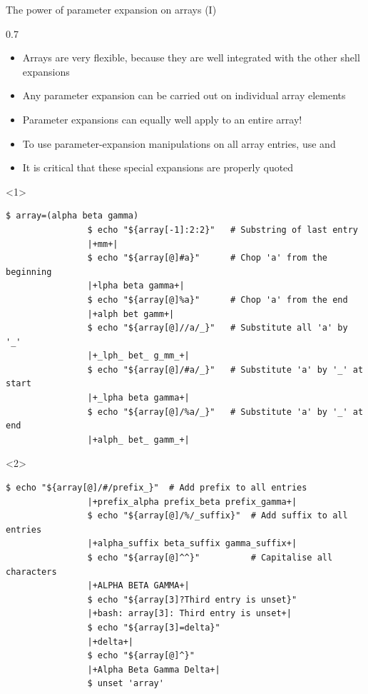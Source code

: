 \begin{frame}[fragile]{The power of parameter expansion on arrays (I)}
    \begin{overlayarea}{\textwidth}{0.7\textheight}
         \begin{itemize}
             \item Arrays are very flexible, because they are well integrated with the other shell expansions
             \item Any parameter expansion can be carried out on individual array elements
             \item Parameter expansions can equally well apply to an entire array!
             \item To use parameter-expansion manipulations on all array entries, use \PB{\texttt{[@]}} and \PB{\texttt{[*]}}
             \item It is critical that these special expansions are properly quoted
         \end{itemize}
        \begin{onlyenv}<1>
            \begin{lstlisting}[style=MyBash, aboveskip=2mm, xrightmargin=3mm]
                $ array=(alpha beta gamma)
                $ echo "${array[-1]:2:2}"   # Substring of last entry
                |+mm+|
                $ echo "${array[@]#a}"      # Chop 'a' from the beginning
                |+lpha beta gamma+|
                $ echo "${array[@]%a}"      # Chop 'a' from the end
                |+alph bet gamm+|
                $ echo "${array[@]//a/_}"   # Substitute all 'a' by '_'
                |+_lph_ bet_ g_mm_+|
                $ echo "${array[@]/#a/_}"   # Substitute 'a' by '_' at start
                |+_lpha beta gamma+|
                $ echo "${array[@]/%a/_}"   # Substitute 'a' by '_' at end
                |+alph_ bet_ gamm_+|
            \end{lstlisting}
        \end{onlyenv}
        \begin{onlyenv}<2>
            \begin{lstlisting}[style=MyBash, aboveskip=2mm, xrightmargin=3mm, firstnumber=14]
                $ echo "${array[@]/#/prefix_}"  # Add prefix to all entries
                |+prefix_alpha prefix_beta prefix_gamma+|
                $ echo "${array[@]/%/_suffix}"  # Add suffix to all entries
                |+alpha_suffix beta_suffix gamma_suffix+|
                $ echo "${array[@]^^}"          # Capitalise all characters
                |+ALPHA BETA GAMMA+|
                $ echo "${array[3]?Third entry is unset}"
                |+bash: array[3]: Third entry is unset+|
                $ echo "${array[3]=delta}"
                |+delta+|
                $ echo "${array[@]^}"
                |+Alpha Beta Gamma Delta+|
                $ unset 'array'
            \end{lstlisting}
        \end{onlyenv}
    \end{overlayarea}
\end{frame}
